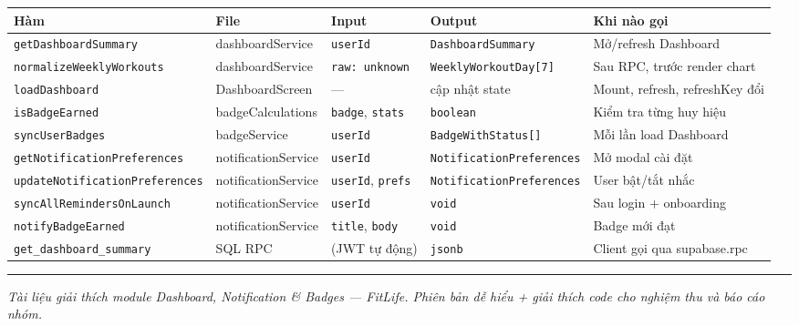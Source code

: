 \documentclass[12pt,a4paper]{article}
\begin{document}
{\def\LTcaptype{none} %
\begin{longtable}[]{@{}
  >{\raggedright\arraybackslash}p{}
  >{\raggedright\arraybackslash}p{}
  >{\raggedright\arraybackslash}p{}
  >{\raggedright\arraybackslash}p{}
  >{\raggedright\arraybackslash}p{}@{}}
\toprule\noalign{}
\begin{minipage}[b]{\linewidth}\raggedright
Hàm
\end{minipage} & \begin{minipage}[b]{\linewidth}\raggedright
File
\end{minipage} & \begin{minipage}[b]{\linewidth}\raggedright
Input
\end{minipage} & \begin{minipage}[b]{\linewidth}\raggedright
Output
\end{minipage} & \begin{minipage}[b]{\linewidth}\raggedright
Khi nào gọi
\end{minipage} \\
\midrule\noalign{}
\endhead
\bottomrule\noalign{}
\endlastfoot
\texttt{getDashboardSummary} & dashboardService & \texttt{userId} &
\texttt{DashboardSummary} & Mở/refresh Dashboard \\
\texttt{normalizeWeeklyWorkouts} & dashboardService &
\texttt{raw:\ unknown} & \texttt{WeeklyWorkoutDay{[}7{]}} & Sau RPC,
trước render chart \\
\texttt{loadDashboard} & DashboardScreen & --- & cập nhật state & Mount,
refresh, refreshKey đổi \\
\texttt{isBadgeEarned} & badgeCalculations & \texttt{badge},
\texttt{stats} & \texttt{boolean} & Kiểm tra từng huy hiệu \\
\texttt{syncUserBadges} & badgeService & \texttt{userId} &
\texttt{BadgeWithStatus{[}{]}} & Mỗi lần load Dashboard \\
\texttt{getNotificationPreferences} & notificationService &
\texttt{userId} & \texttt{NotificationPreferences} & Mở modal cài đặt \\
\texttt{updateNotificationPreferences} & notificationService &
\texttt{userId}, \texttt{prefs} & \texttt{NotificationPreferences} &
User bật/tắt nhắc \\
\texttt{syncAllRemindersOnLaunch} & notificationService &
\texttt{userId} & \texttt{void} & Sau login + onboarding \\
\texttt{notifyBadgeEarned} & notificationService & \texttt{title},
\texttt{body} & \texttt{void} & Badge mới đạt \\
\texttt{get\_dashboard\_summary} & SQL RPC & (JWT tự động) &
\texttt{jsonb} & Client gọi qua supabase.rpc \\
\end{longtable}
}

\begin{center}\rule{0.5\linewidth}{0.5pt}\end{center}

\emph{Tài liệu giải thích module Dashboard, Notification \& Badges ---
FitLife. Phiên bản dễ hiểu + giải thích code cho nghiệm thu và báo cáo
nhóm.}
\end{document}
